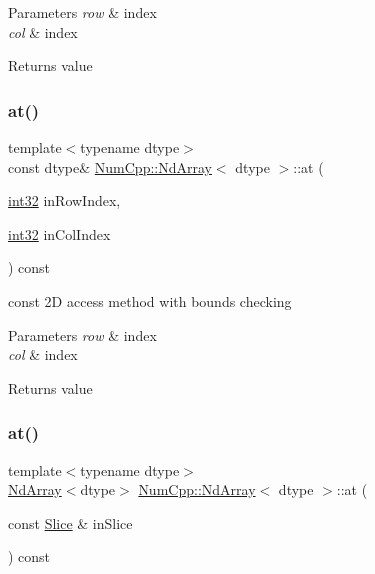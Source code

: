 \begin{DoxyParams}{Parameters}
{\em row} & index \\
\hline
{\em col} & index \\
\hline
\end{DoxyParams}
\begin{DoxyReturn}{Returns}
value 
\end{DoxyReturn}
\mbox{\label{class_num_cpp_1_1_nd_array_ab46389e43804bab057f2446b65ee0372}} 
\subsubsection{\texorpdfstring{at()}{at()}\hspace{0.1cm}{\footnotesize\ttfamily [4/8]}}
{\footnotesize\ttfamily template$<$typename dtype$>$ \\
const dtype\& \mbox{\hyperlink{class_num_cpp_1_1_nd_array}{Num\+Cpp\+::\+Nd\+Array}}$<$ dtype $>$\+::at (\begin{DoxyParamCaption}\item[{\mbox{\hyperlink{namespace_num_cpp_acf3eb1592f8b248ff0a236634864633c}{int32}}}]{in\+Row\+Index,  }\item[{\mbox{\hyperlink{namespace_num_cpp_acf3eb1592f8b248ff0a236634864633c}{int32}}}]{in\+Col\+Index }\end{DoxyParamCaption}) const\hspace{0.3cm}{\ttfamily [inline]}}

const 2D access method with bounds checking


\begin{DoxyParams}{Parameters}
{\em row} & index \\
\hline
{\em col} & index \\
\hline
\end{DoxyParams}
\begin{DoxyReturn}{Returns}
value 
\end{DoxyReturn}
\mbox{\label{class_num_cpp_1_1_nd_array_ac5616ec092cdf5370b78f88ff82384e1}} 
\subsubsection{\texorpdfstring{at()}{at()}\hspace{0.1cm}{\footnotesize\ttfamily [5/8]}}
{\footnotesize\ttfamily template$<$typename dtype$>$ \\
\mbox{\hyperlink{class_num_cpp_1_1_nd_array}{Nd\+Array}}$<$dtype$>$ \mbox{\hyperlink{class_num_cpp_1_1_nd_array}{Num\+Cpp\+::\+Nd\+Array}}$<$ dtype $>$\+::at (\begin{DoxyParamCaption}\item[{const \mbox{\hyperlink{class_num_cpp_1_1_slice}{Slice}} \&}]{in\+Slice }\end{DoxyParamCaption}) const\hspace{0.3cm}{\ttfamily [inline]}}

